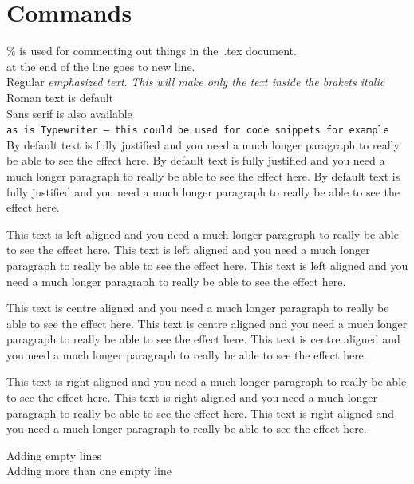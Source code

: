 \documentclass[16pt,a4paper]{article}
\begin{document}
\section{Commands}
\% is used for commenting out things in the~.tex document.
\\ at the end of the line goes to new line. \\
Regular \emph{emphasized text}.
\textit{This will make only the \emph{text} inside the brakets italic}\\
\textrm{Roman text is default}\\
\textsf{Sans serif is also available}\\
\texttt{as is Typewriter – this could be used for code snippets for example}\\
By default text is fully justified and you need a much longer paragraph to really be able to see the effect here.
By default text is fully justified and you need a much longer paragraph to really be able to see the effect here.
By default text is fully justified and you need a much longer paragraph to really be able to see the effect here.
\begin{flushleft}
    This text is left aligned and you need a much longer paragraph to really be able to see the effect here.
    This text is left aligned and you need a much longer paragraph to really be able to see the effect here.
    This text is left aligned and you need a much longer paragraph to really be able to see the effect here.
\end{flushleft}
\begin{center}
    This text is centre aligned and you need a much longer paragraph to really be able to see the effect here.
    This text is centre aligned and you need a much longer paragraph to really be able to see the effect here.
    This text is centre aligned and you need a much longer paragraph to really be able to see the effect here.
\end{center}
\begin{flushright}
    This text is right aligned and you need a much longer paragraph to really be able to see the effect here.
    This text is right aligned and you need a much longer paragraph to really be able to see the effect here.
    This text is right aligned and you need a much longer paragraph to really be able to see the effect here.
\end{flushright}

Adding empty lines\\[\baselineskip]
Adding more than one empty line\\[2\baselineskip]
\end{document}
